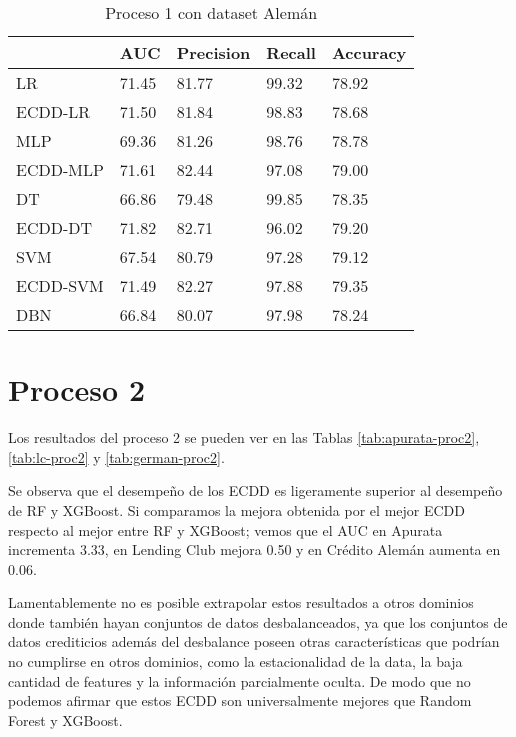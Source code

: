 \begin{table}[]
\centering
\caption{Proceso 1 con dataset Alemán}
\label{tab:german-proc1}
\begin{tabularx}{0.75\textwidth}{|l|Y Y Y Y|}
                \hline
                & AUC       & Precision & Recall    & Accuracy  \\
                \hline
LR              & 71.45     & 81.77     & 99.32     & 78.92     \\
ECDD-LR           & 71.50     & 81.84     & 98.83     & 78.68     \\
                \hline
MLP             & 69.36     & 81.26     & 98.76     & 78.78     \\
ECDD-MLP          & 71.61     & 82.44     & 97.08     & 79.00     \\
                \hline
DT              & 66.86     & 79.48     & 99.85     & 78.35     \\
ECDD-DT           & 71.82     & 82.71     & 96.02     & 79.20     \\
                \hline
SVM             & 67.54     & 80.79     & 97.28     & 79.12     \\
ECDD-SVM          & 71.49     & 82.27     & 97.88     & 79.35     \\
                \hline
DBN             & 66.84     & 80.07     & 97.98     & 78.24     \\
                \hline
\end{tabularx}
\end{table}


\section{Proceso 2} %

Los resultados del proceso 2 se pueden ver en las Tablas \ref{tab:apurata-proc2}, \ref{tab:lc-proc2} y \ref{tab:german-proc2}.

Se observa que el desempeño de los \ac{ECDD} es ligeramente superior al desempeño de \ac{RF} y \ac{XGBoost}. Si comparamos la mejora obtenida por el mejor \ac{ECDD} respecto al mejor entre RF y XGBoost; vemos que el AUC en Apurata incrementa 3.33, en Lending Club mejora 0.50 y en Crédito Alemán aumenta en 0.06.

Lamentablemente no es posible extrapolar estos resultados a otros dominios donde también hayan conjuntos de datos desbalanceados, ya que los conjuntos de datos crediticios además del desbalance poseen otras características que podrían no cumplirse en otros dominios, como la estacionalidad de la data, la baja cantidad de features y la información parcialmente oculta. De modo que no podemos afirmar que estos \ac{ECDD} son universalmente mejores que Random Forest y XGBoost.

